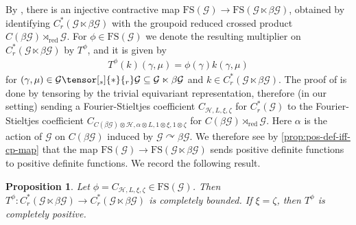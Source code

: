 \documentclass[11pt,a4paper,oneside,final,reqno]{amsart}
\newtheorem{proposition}[lemma]{Proposition}
\theoremstyle{definition}
\newcommand{\G}{\mathcal{G}}
\newcommand{\curlyH}{\mathcal{H}}
\newcommand{\FS}{\mathrm{FS}}
\newcommand{\Cred}{C_{r}^{*}}
\def\acts{\curvearrowright}
\numberwithin{equation}{section}
\begin{document}
	By \cite[Proposition 7.12]{BussKwasniewskiMcKeeSkalski2024}, there is an injective contractive map 
	$\FS(\G) \to \FS (\G \ltimes \beta\G)$,
	obtained by identifying 
	$\Cred ( \G \ltimes \beta\G)$ 
	with the groupoid reduced crossed product $C(\beta \G) \rtimes_{\mathrm{red}} \G$. 
	For $\phi \in \FS(\G)$ we denote the resulting multiplier on $\Cred(\G \ltimes \beta \G)$ by $T^\phi$, and it is given by
	\begin{align}\label{eq:Roe-algebra-lifted-multiplier}
		T^\phi(k) ( \gamma, \mu) = \phi(\gamma) k( \gamma, \mu)
	\end{align}
	for $(\gamma, \mu) \in \G \tensor[_s]{*}{_r} \G \subseteq \G \ltimes \beta \G$ and $k \in \Cred(\G \ltimes \beta \G)$. 
	The proof of \cite[Proposition 7.12]{BussKwasniewskiMcKeeSkalski2024} is done by tensoring by the trivial equivariant representation, therefore (in our setting) sending a Fourier-Stieltjes coefficient $C_{\curlyH, L, \xi, \zeta}$ for $\Cred (\G)$ to the Fourier-Stieltjes coefficient $C_{C(\beta \G) \otimes \curlyH , \alpha \otimes L, 1 \otimes \xi , 1 \otimes \zeta }$ for $C(\beta \G) \rtimes_{\mathrm{red}} \G$. Here $\alpha$ is the action of $\G$ on $C(\beta \G)$ induced by $\G \acts \beta\G$. We therefore see by \cref{prop:pos-def-iff-cp-map} that the map $\FS(\G) \to \FS (\G \ltimes \beta \G )$ sends positive definite functions to positive definite functions. 
	We record the following result.
	\begin{proposition}\label{prop:multipliers-lift-to-crossed-product}
		Let $\phi = C_{\curlyH, L, \xi, \zeta} \in \FS(\G)$. Then  
		${T^\phi} \colon \Cred ( \G \ltimes \beta\G) \to \Cred ( \G \ltimes \beta\G)$ 
		is completely bounded. If $\xi = \zeta$, then ${T^\phi}$ is completely positive. 
	\end{proposition}
	
\end{document}
